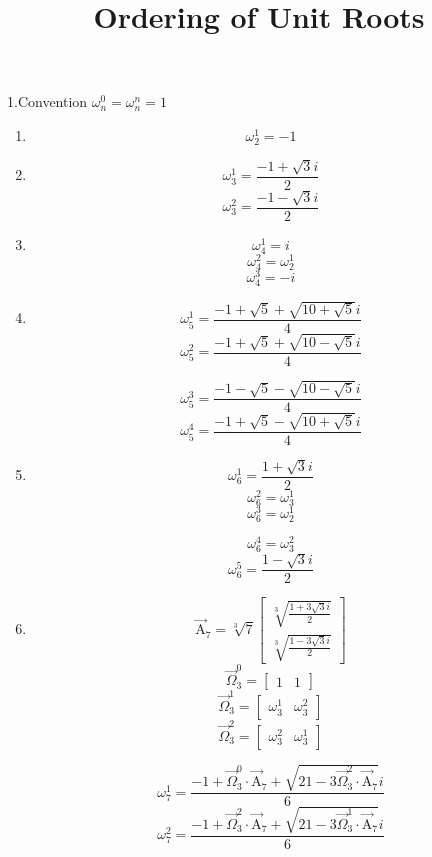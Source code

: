 \documentclass{article}
\title{Ordering of Unit Roots}
\date{}
\begin{document}
\maketitle

1.Convention $\omega_{n}^{0}=\omega_{n}^{n}=1$

\begin{enumerate}
\item \[ \omega_{2}^{1}=-1 \]

\item \[ \omega_{3}^{1}=\frac{-1+\sqrt{3}i}{2} \]
\[ \omega_{3}^{2}=\frac{-1-\sqrt{3}i}{2} \]

\item \[ \omega_{4}^{1}=i \]
\[ \omega_{4}^{2}=\omega_{2}^{1} \]
\[ \omega_{4}^{3}=-i \]

\item \[ \omega_{5}^{1}=\frac{-1+\sqrt{5}+\sqrt{10+\sqrt{5}}i}{4} \]
\[ \omega_{5}^{2}=\frac{-1+\sqrt{5}+\sqrt{10-\sqrt{5}}i}{4} \]

\[ \omega_{5}^{3}=\frac{-1-\sqrt{5}-\sqrt{10-\sqrt{5}}i}{4} \]
\[ \omega_{5}^{4}=\frac{-1+\sqrt{5}-\sqrt{10+\sqrt{5}}i}{4} \]

\item \[ \omega_{6}^{1}=\frac{1+\sqrt{3}i}{2} \]
\[ \omega_{6}^{2}=\omega_{3}^{1} \]
\[ \omega_{6}^{3}=\omega_{2}^{1} \]

\[ \omega_{6}^{4}=\omega_{3}^{2} \]
\[ \omega_{6}^{5}=\frac{1-\sqrt{3}i}{2} \]

\item \[ \vec{\mathrm{A}}_{7}=\sqrt[3]{7}\left[ \begin{matrix} \sqrt[3]{\frac{1+3\sqrt{3}i}{2}} \\ \sqrt[3]{\frac{1-3\sqrt{3}i}{2}} \end{matrix} \right] \]
\[ \vec{\Omega}_{3}^{0}=\left[ \begin{matrix} 1 & 1 \end{matrix} \right] \]
\[ \vec{\Omega}_{3}^{1}=\left[ \begin{matrix} \omega_{3}^{1} & \omega_{3}^{2} \end{matrix} \right] \]
\[ \vec{\Omega}_{3}^{2}=\left[ \begin{matrix} \omega_{3}^{2} & \omega_{3}^{1} \end{matrix} \right] \]

\[ \omega_{7}^{1}=\frac{-1+\vec{\Omega}_{3}^{0}\cdot\vec{\mathrm{A}}_{7}+\sqrt{21-3\vec{\Omega}_{3}^{2}\cdot\vec{\mathrm{A}}_{7}}i}{6} \]
\[ \omega_{7}^{2}=\frac{-1+\vec{\Omega}_{3}^{2}\cdot\vec{\mathrm{A}}_{7}+\sqrt{21-3\vec{\Omega}_{3}^{1}\cdot\vec{\mathrm{A}}_{7}}i}{6} \]


\end{enumerate}
\end{document}
